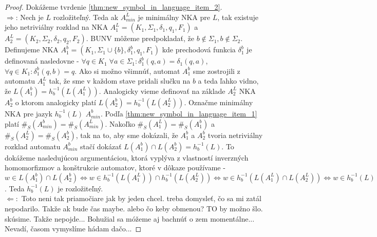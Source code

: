 \begin{proof}
\par
Dokážeme tvrdenie \ref{thm:new_symbol_in_language_item_2}. \\
$ \Rightarrow $: Nech je $ L $ rozložiteľný. Teda ak $ A_{min}^L $ je minimálny NKA pre $ L $, tak existuje jeho netriviálny rozklad na NKA $ A_1^{L}=(K_1, \Sigma_1, \delta_1, q_1, F_1) $ a $ A_2^{L}=(K_2, \Sigma_2, \delta_2, q_2, F_2) $. BUNV môžeme predpokladať, že $ b \notin \Sigma_1,b \notin \Sigma_2 $.  Definujeme NKA $ A_1^{b} = (K_1, \Sigma_1 \cup \lbrace b \rbrace, \delta_1^b, q_1, F_1) $ kde prechodová funkcia $ \delta_1^b $ je definovaná nasledovne - $ \forall q \in K_1 \; \forall a \in \Sigma_1: \delta_1^b(q,a)=\delta_1(q,a) $, $ \forall q \in K_1 : \delta_1^b(q,b) = {q}$. Ako si možno všimnúť, automat $ A_1^{b} $ sme zostrojili z automatu $ A_1^L $ tak, že sme v každom stave pridali slučku na $ b $ a teda ľahko vidno, že $ L(A_1^{b}) = h_{b}^{-1}(L(A_1^L)) $. Analogicky vieme definovať na základe $ A_2^L $ NKA $ A_2^{b} $ o ktorom analogicky platí $ L(A_2^{b}) = h_{b}^{-1}(L(A_2^L)) $. Označme minimálny NKA pre jazyk $ h_b^{-1}(L) $ $ A_{min}^b $. Podľa \ref{thm:new_symbol_in_language_item_1} platí $ \#_S(A_{min}^b) = \#_S(A_{min}^L) $. Nakoľko $ \#_S(A_1^L) = \#_S(A_1^b) $ a $ \#_S(A_2^L) = \#_S(A_2^b) $, tak na to, aby sme dokázali, že $ A_1^b $ a $ A_2^b $ tvoria netriviálny rozklad automatu $ A_{min}^b $ stačí dokázať $ L(A_1^b) \cap L(A_2^b) = h_b^{-1}(L) $. To dokážeme nasledujúcou argumentáciou, ktorá vyplýva z vlastností inverzných homomorfizmov a konštrukcie automatov, ktoré v dôkaze používame - $ w \in L(A_1^b) \cap L(A_2^b) \Leftrightarrow w \in h_b^{-1}(L(A_1^L)) \cap h_b^{-1}(L(A_2^L)) \Leftrightarrow w \in h_b^{-1}(L(A_1^L) \cap L(A_2^L)) \Leftrightarrow w \in h_b^{-1}(L) $. Teda $ h_b^{-1}(L) $ je rozložiteľný. \\
$ \Leftarrow: $ Toto neni tak priamočiare jak by jeden chcel. treba domysleť, čo sa mi zatál nepodarilo. Takže ak bude čas maybe. alebo čo keby obmenou? TO by možno šlo. skúsime. Takže nepojde... Bohužial sa móžeme aj bachnúť o zem momentálne... Nevadí, časom vymyslíme hádam dačo...
\end{proof}















